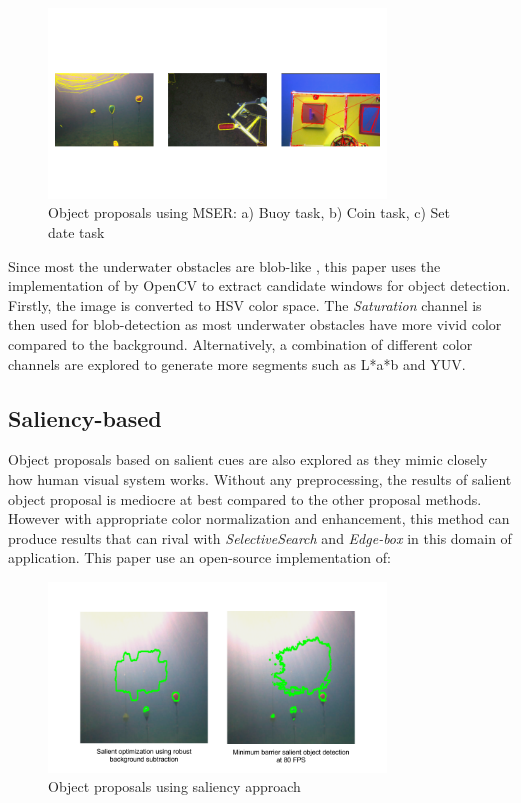 \documentclass[hyp]{socreport}
\begin{document}
\begin{figure}[H]
\centering
  \includegraphics[width=0.8\textwidth, height=0.3\textheight]{mserproposal.png}
  \caption{Object proposals using MSER: a) Buoy task, b) Coin task, c) Set date task}
  \label{fig:mser_proposal}
\end{figure}

Since most the underwater obstacles are blob-like , this paper uses the
implementation of  by OpenCV to extract candidate
windows for object detection. Firstly, the image is converted to HSV color
space. The \textit{Saturation} channel is then used for blob-detection as most
underwater obstacles have more vivid color compared to the background.
Alternatively, a combination of different color channels are explored to
generate more segments such as L*a*b and YUV.

\subsection{Saliency-based}

Object proposals based on salient cues are also explored as they mimic closely
how human visual system works. Without any preprocessing, the results of salient
object proposal is mediocre at best compared to the other proposal methods.
However with appropriate color normalization and enhancement, this method can
produce results that can rival with \textit{SelectiveSearch} and
\textit{Edge-box} in this domain of application. This paper use an open-source implementation of:

\begin{figure}[H]
\centering
  \includegraphics[width=0.8\textwidth, height=0.3\textheight]{saliency.png}
  \caption{Object proposals using saliency approach}
  \label{fig:salient_proposal}
\end{figure}
\end{document}
